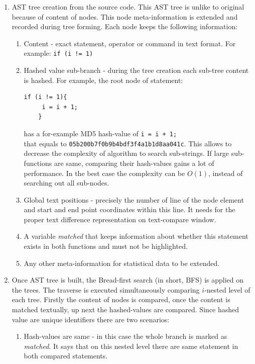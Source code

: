 \documentclass{report}
\begin{document}
\begin{enumerate}
  \item AST tree creation from the source code. This AST tree is unlike to original because of content of nodes. This node meta-information is extended and recorded during tree forming. Each node keeps the following information:
  	\begin{enumerate}[label*=\arabic*.]
		\item Content - exact statement, operator or command in text format. For example: \texttt{if (i != 1)}  	 
		\item Hashed value sub-branch - during the tree creation each sub-tree content is hashed. For example, the root node of statement:
\begin{lstlisting}[frame = none]
	if (i != 1){
	 i = i + 1;
 	}
\end{lstlisting}
		 has a for-example MD5 hash-value of \texttt{i = i + 1;}\\ that equals to \texttt{05b200b7f0b9b4bdf3f4a1b1d8aa041c}. This allows to decrease the complexity of algorithm to search sub-strings. If large sub-functions are same, comparing their hash-values gains a lot of performance. In the best case the complexity can be $O(1)$, instead of searching out all sub-nodes.
		 \item Global text positions - precisely the number of line of the node element and start and end point coordinates within this line. It needs for the proper text difference representation on text-compare window.
		 \item A variable \emph{matched} that keeps information about whether this statement exists in both functions and must not be highlighted.
		 \item Any other meta-information for statistical data to be extended.
  	 \end{enumerate}
  \item Once AST tree is built, the Bread-first search (in short, BFS) is applied on the trees. The traverse is executed simultaneously comparing $i$-nested level of each tree. Firstly the content of nodes is compared, once the content is matched textually, up next the hashed-values are compared. Since hashed value are unique identifiers there are two scenarios:
	  \begin{enumerate}[label*=\arabic*.]
  			\item Hash-values are same - in this case the whole branch is marked as \emph{matched}. It says that on this nested level there are same statement in both compared statements.

\end{enumerate}
\end{enumerate}
\end{document}
